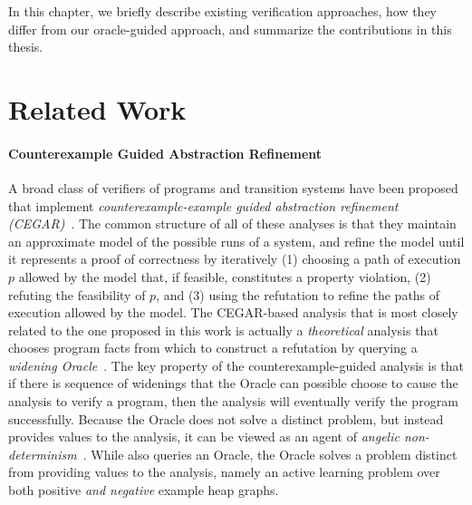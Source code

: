 \label{ch:conclusion}

In this chapter, we briefly describe existing verification approaches, how they differ
from our oracle-guided approach, and summarize the contributions in this thesis.

\section{Related Work}
\label{sec:related-work}

\paragraph{Counterexample Guided Abstraction Refinement}
A broad class of verifiers of programs and transition systems have
been proposed that implement \emph{counterexample-example guided
  abstraction refinement (CEGAR)}~\cite{clarke03}.
%
The common structure of all of these analyses is that they maintain an
approximate model of the possible runs of a system, and refine the
model until it represents a proof of correctness by iteratively (1)
choosing a path of execution $p$ allowed by the model that, if
feasible, constitutes a property violation, (2) refuting the
feasibility of $p$, and (3) using the refutation to refine the paths
of execution allowed by the model.
The CEGAR-based analysis that is most closely related to the
one proposed in this work is actually a \emph{theoretical} analysis
that chooses program facts from which to construct a refutation by
querying a \emph{widening Oracle}~\cite{ball02}.
%
The key property of the counterexample-guided analysis is that if there is
sequence of widenings that the Oracle can possible choose to cause the
analysis to verify a program, then the analysis will eventually verify
the program successfully.
%
Because the Oracle does not solve a distinct problem, but instead
provides values to the analysis, it can be viewed as an agent of
\emph{angelic non-determinism}~\cite{bodik10}.
While \verifier also queries an Oracle, the Oracle solves a problem
distinct from providing values to the analysis, namely an active
learning problem over both positive \emph{and negative} example
heap graphs.

